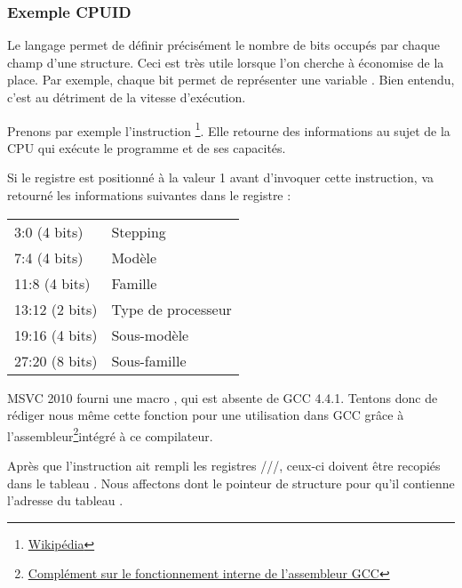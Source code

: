 ﻿\subsubsection{Exemple CPUID}

Le langage \CCpp permet de définir précisément le nombre de bits occupés par chaque champ d'une structure. 
Ceci est très utile lorsque l'on cherche à économise de la place. Par exemple, chaque bit permet de 
représenter une variable \Tbool. Bien entendu, c'est au détriment de la vitesse d'exécution.

\newcommand{\FNCPUID}{\footnote{\href{http://en.wikipedia.org/wiki/CPUID}{Wikipédia}}}

\label{cpuid}

Prenons par exemple l'instruction \CPUID\FNCPUID. Elle retourne des informations au sujet de la CPU qui 
exécute le programme et de ses capacités.

Si le registre \EAX est positionné à la valeur 1 avant d'invoquer cette instruction, \CPUID va retourné 
les informations suivantes dans le registre \EAX:

\begin{center}
\begin{tabular}{ | l | l | }
\hline
3:0 (4 bits)& Stepping \\
7:4 (4 bits) & Modèle \\
11:8 (4 bits) & Famille \\
13:12 (2 bits) & Type de processeur \\
19:16 (4 bits) & Sous-modèle \\
27:20 (8 bits) & Sous-famille \\
\hline
\end{tabular}
\end{center}

\newcommand{\FNGCCAS}{\footnote{\href{http://www.ibiblio.org/gferg/ldp/GCC-Inline-Assembly-HOWTO.html}
{Complément sur le fonctionnement interne de l'assembleur GCC}}}

MSVC 2010 fourni une macro \CPUID, qui est absente de GCC 4.4.1. Tentons donc de rédiger nous même cette 
fonction pour une utilisation dans GCC grâce à l'assembleur\FNGCCAS intégré à ce compilateur.



Après que l'instruction \CPUID ait rempli les registres \EAX/\EBX/\ECX/\EDX, ceux-ci doivent être recopiés 
dans le tableau . Nous affectons dont le pointeur de structure  pour qu'il 
contienne l'adresse du tableau .

